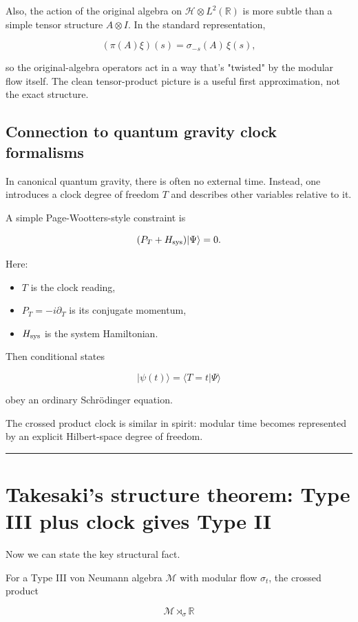 \documentclass[11pt,a4paper]{article}
\begin{document}
Also, the action of the original algebra on $\mathcal{H} \otimes L^2(\mathbb{R})$ is more subtle than a simple tensor structure $A \otimes I$. In the standard representation,

\[
(\pi(A)\xi)(s) = \sigma_{-s}(A) \, \xi(s),
\]

so the original-algebra operators act in a way that's "twisted" by the modular flow itself. The clean tensor-product picture is a useful first approximation, not the exact structure.

\subsection{Connection to quantum gravity clock formalisms}

In canonical quantum gravity, there is often no external time. Instead, one introduces a clock degree of freedom $T$ and describes other variables relative to it.

A simple Page-Wootters-style constraint is

\[
(P_T+H_{\rm sys})|\Psi\rangle=0.
\]

Here:

\begin{itemize}
  \item $T$ is the clock reading,
  \item $P_T=-i\partial_T$ is its conjugate momentum,
  \item $H_{\rm sys}$ is the system Hamiltonian.
\end{itemize}

Then conditional states

\[
|\psi(t)\rangle = \langle T=t|\Psi\rangle
\]

obey an ordinary Schrödinger equation.

The crossed product clock is similar in spirit: modular time becomes represented by an explicit Hilbert-space degree of freedom.

\medskip\hrule\medskip

\section{Takesaki’s structure theorem: Type III plus clock gives Type II}

Now we can state the key structural fact.

For a Type III von Neumann algebra $\mathcal{M}$ with modular flow $\sigma_t$, the crossed product

\[
\mathcal{M}\rtimes_{\sigma}\mathbb{R}
\]
\end{document}
